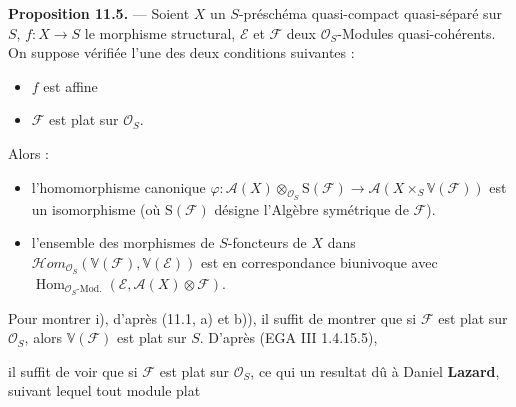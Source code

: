 \documentclass[11pt,a4paper]{article}
\begin{document}
\textbf{Proposition 11.5.} — Soient $X$ un $S$-préschéma quasi-compact
quasi-séparé sur $S$, $f : X \to S$ le morphisme structural, $\mathcal{E}$
et $\mathcal{F}$ deux $\mathcal{O}_{S}$-Modules quasi-cohérents. On suppose
vérifiée l'une des deux conditions suivantes :
\begin{itemize}
\item[a)] $f$ est affine
\item[b)] $\mathcal{F}$ est plat sur $\mathcal{O}_{S}$.
\end{itemize}
Alors :
\begin{itemize}
\item[i)] l'homomorphisme canonique
$\varphi : \mathcal{A}(X) \otimes_{\mathcal{O}_{S}} \mathrm{S}(\mathcal{F})
\longrightarrow \mathcal{A}(X \times_{S} \mathbb{V}(\mathcal{F}))$ est un
isomorphisme (où $\mathrm{S}(\mathcal{F})$ désigne l'Algèbre symétrique de
$\mathcal{F}$).
\item[ii)] l'ensemble des morphismes de $S$-foncteurs de $X$ dans
$\mathcal{H}om_{\mathcal{O}_{S}}(\mathbb{V}(\mathcal{F}), \mathbb{V}(\mathcal{E}))$
est en correspondance biunivoque avec
$\operatorname{Hom}_{\mathcal{O}_{S}\text{-Mod.}}
(\mathcal{E}, \mathcal{A}(X) \otimes \mathcal{F})$.
\end{itemize}


Pour montrer i), d'après (11.1, a) et b)), il suffit de montrer que si
$\mathcal{F}$ est plat sur $\mathcal{O}_{S}$, \struck{\ill{}} alors
$\mathbb{V}(\mathcal{F})$ est plat sur $S$. D'après (EGA III 1.4.15.5),

il suffit de voir que si $\mathcal{F}$ est plat sur $\mathcal{O}_{S}$,
 ce qui
un resultat dû à Daniel \textbf{Lazard}, suivant lequel
tout module plat

\end{document}

